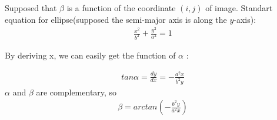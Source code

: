 \documentclass[hyperref]{ctexart}
\begin{document}
{\begin{multicols}{2}
		Supposed that $\beta$ is a function of the coordinate $(i,j)$ of image. Standart equation for ellipse(supposed the semi-major axis is along the $y$-axis):
		\begin{equation}
			\begin{split}
				\frac{x^2}{b^2} + \frac{y^2}{a^2} = 1
			\end{split}
		\end{equation}
		
		By deriving x, we can easily get the function of $\alpha$ :
		\begin{figure}[H]
			\centering
		\end{figure}
		\begin{equation}
			\begin{split}
				tan\alpha  = \frac{dy}{dx} = - \frac{a^2 x}{b^2 y}
			\end{split}
		\end{equation}
		$\alpha$ and $\beta$ are complementary, so
		\begin{equation}
			\begin{split}
				\beta  =arctan(-\frac{b^2y}{a^2x})
			\end{split}
		\end{equation}
	

\end{multicols}}
\end{document}
